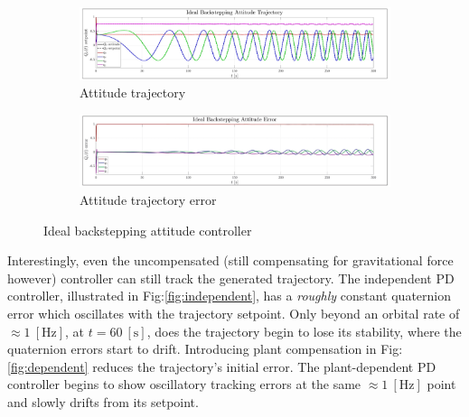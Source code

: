 \begin{figure}[htbp]
\centering
\vspace{-8pt}
\begin{subfigure}{0.9\textwidth}
\centering
\includegraphics[width=\textwidth]{graphs/IBC_Trajectory}
\vspace{-18pt}
\caption{Attitude trajectory}
\label{fig:backstepping_trajectory}
\end{subfigure}
\begin{subfigure}{0.9\textwidth}
\centering
\includegraphics[width=\textwidth]{graphs/IBC_Error}
\vspace{-18pt}
\caption{Attitude trajectory error}
\label{fig:backstepping_error}
\end{subfigure}
\vspace{-10pt}
\caption{Ideal backstepping attitude controller}
\label{fig:backstepping}
\end{figure}
Interestingly, even the uncompensated (still compensating for gravitational force however) controller can still track the generated trajectory. The independent PD controller, illustrated in Fig:\ref{fig:independent}, has a \emph{roughly} constant quaternion error which oscillates with the trajectory setpoint. Only beyond an orbital rate of $\approx 1~[\text{Hz}]$, at $t=60~[\text{s}]$, does the trajectory begin to lose its stability, where the quaternion errors start to drift. Introducing plant compensation in Fig:\ref{fig:dependent} reduces the trajectory's initial error. The plant-dependent PD controller begins to show oscillatory tracking errors at the same $\approx 1~[\text{Hz}]$ point and slowly drifts from its setpoint.
\par
